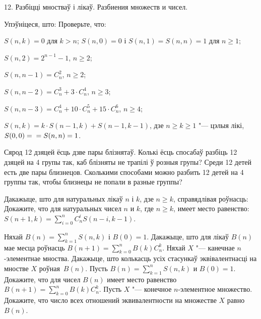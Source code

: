 \documentclass[12pt, a4paper]{article}
\begin{document}
\biLangHeader
{12. Разбіцці мностваў і лікаў.}
{Разбиения множеств и чисел.}

\begin{problemList}

\problemItemWithCommonPart
{Упэўніцеся, што:}
{Проверьте, что:}
{%
\begin{belarusianEnumerate}
    \item $S(n, k) = 0$ для $k > n$; $S(n, 0) = 0$ і $S(n, 1) = S(n, n) = 1$ для $n \ge 1$;
    \item $S(n, 2) = 2^{n - 1} - 1$, $n \ge 2$;
    \item $S(n, n - 1) = C_n^2$, $n \ge 2$;
    \item $S(n, n - 2) = C_n^3 + 3 \cdot C_n^4$, $n \ge 3$;
    \item $S(n, n - 3) = C_n^4 + 10 \cdot C_n^5 + 15 \cdot C_n^6$, $n \ge 4$;
    \item $S(n, k) = k \cdot S(n - 1, k) + S(n - 1, k - 1)$, дзе $n \ge k \ge 1$ "--- цэлыя лікі,
    $S(0, 0) = \\ = S(n, n) = 1$.
\end{belarusianEnumerate}
}

\smallskip

\problemItemSimple
{Сярод 12 дзяцей ёсць дзве пары блізнятаў. Колькі ёсць спосабаў разбіць 12 дзяцей
на 4 групы так, каб блізняты не трапілі ў розныя групы?}
{Среди 12 детей есть две пары близнецов. Сколькими способами можно разбить
12 детей на 4 группы так, чтобы близнецы не попали в разные группы?}

\bigskip

\problemItemWithCommonPart
{Дакажыце, што для натуральных лікаў $n$ і $k$, дзе $n \ge k$,
справядлівая роўнасць:}
{Докажите, что для натуральных чисел $n$ и $k$, где $n \ge k$,
имеет место равенство:}
{$S(n + 1, k) = \sum\limits_{i = 0}^n C_n^i S(n - i, k - 1)$.}

\bigskip

\problemItemSimple
{Няхай $B(n) = \sum\limits_{k = 1}^n S(n, k)$ і $B(0) = 1$. Дакажыце,
што для лікаў $B(n)$ мае месца роўнасць $B(n + 1) = \sum\limits_{k = 0}^n B(k)C_n^k$.
Няхай $X$ "--- канечнае $n$-элементнае мноства. Дакажыце, што колькасць усіх
стасункаў эквівалентнасці на мностве $X$ роўная~$B(n)$.}
{Пусть $B(n) = \sum\limits_{k = 1}^n S(n, k)$ и $B(0) = 1$. Докажите,
что для чисел $B(n)$ имеет место равенство $B(n + 1) = \sum\limits_{k = 0}^n B(k)C_n^k$.
Пусть $X$ "--- конечное $n$-элементное множество. Докажите, что число всех
отношений эквивалентности на множестве $X$ равно~$B(n)$.}


\end{problemList}
\end{document}
